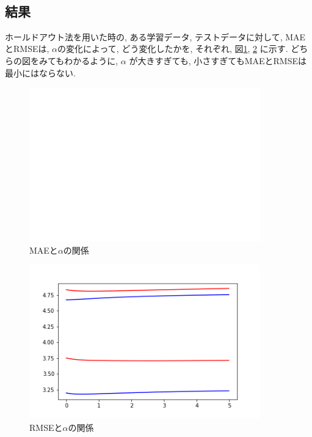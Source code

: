 \documentclass{jsarticle}
\begin{document}
\scriptsize
\begin{verbatim}


\end{verbatim}
\normalsize

\subsection{結果}
ホールドアウト法を用いた時の, ある学習データ, テストデータに対して, MAEとRMSEは, $\alpha$の変化によって, どう変化したかを, それぞれ, 図\ref{mae_al}, \ref{rmse_al} に示す.
どちらの図をみてもわかるように, $\alpha$ が大きすぎても, 小さすぎてもMAEとRMSEは最小にはならない.

 
\begin{figure}
\begin{center}
\label{mae_al}
\caption{MAEと$\alpha$の関係}
\includegraphics[width=10cm]{prog/mae.png}
\end{center}
\end{figure}



\begin{figure}
\begin{center}
\label{rmse_al}
\caption{RMSEと$\alpha$の関係}
\includegraphics[width=10cm]{prog/rmse.png}
\end{center}
\end{figure}
\end{document}
